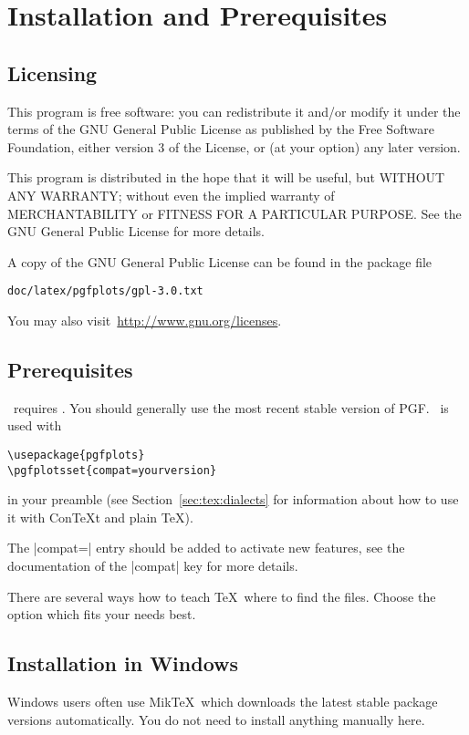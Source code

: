 
\section{Installation and Prerequisites}
\subsection{Licensing}
This program is free software: you can redistribute it and/or modify
it under the terms of the GNU General Public License as published by
the Free Software Foundation, either version 3 of the License, or
(at your option) any later version.

This program is distributed in the hope that it will be useful,
but WITHOUT ANY WARRANTY; without even the implied warranty of
MERCHANTABILITY or FITNESS FOR A PARTICULAR PURPOSE.  See the
GNU General Public License for more details.

A copy of the GNU General Public License can be found in the package file
\begin{verbatim}
doc/latex/pgfplots/gpl-3.0.txt
\end{verbatim}
You may also visit~\url{http://www.gnu.org/licenses}.

\subsection{Prerequisites}
\PGFPlots\ requires \PGF. You should generally use the most recent stable version of PGF. \PGFPlots\ is used with
\begin{verbatim}
\usepackage{pgfplots}
\pgfplotsset{compat=yourversion}
\end{verbatim}
in your preamble (see Section~\ref{sec:tex:dialects} for information about how to use it with Con{\TeX}t and plain \TeX).

The |compat=| entry should be added to activate new features, see the documentation of the |compat| key for more details.


There are several ways how to teach \TeX\ where to find the files. Choose the option which fits your needs best.

\subsection{Installation in Windows}
Windows users often use Mik\TeX\ which downloads the latest stable package versions automatically. You do not need to install anything manually here. 

